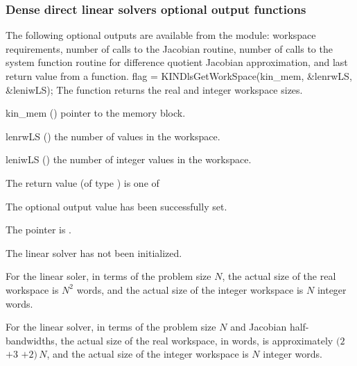 
\subsubsection{Dense direct linear solvers optional output functions}
\label{sss:optout_dense}
The following optional outputs are available from the {\kindls} module:
workspace requirements, number of calls to the Jacobian routine, number of 
calls to the system function routine for difference quotient Jacobian approximation,
and last return value from a {\kindls} function.
{
  flag = KINDlsGetWorkSpace(kin\_mem, \&lenrwLS, \&leniwLS);
}
{
  The function  returns the
  {\kindense} real and integer workspace sizes.
}
{
  \begin{args}
  \item[kin\_mem] ()
    pointer to the {\kinsol} memory block.
  \item[lenrwLS] ()
    the number of  values in the {\kindls} workspace.
  \item[leniwLS] ()
    the number of integer values in the {\kindls} workspace.
  \end{args}
}
{
  The return value  (of type ) is one of
  \begin{args}
  \item[\Id{KINDLS\_SUCCESS}] 
    The optional output value has been successfully set.
  \item[\Id{KINDLS\_MEM\_NULL}]
    The  pointer is .
  \item[\Id{KINDLS\_LMEM\_NULL}]
    The {\kindense} linear solver has not been initialized.
  \end{args}
}
{
  For the {\kindense} linear soler, in terms of the problem size $N$, 
  the actual size of the real workspace is $N^2$  words, 
  and the actual size of the integer workspace is $N$ integer words.

  For the {\kinband} linear solver, in terms of the problem size $N$ 
  and Jacobian half-bandwidths, the actual size of the real workspace, in
   words, is approximately
  $(2$ $+ 3$  $+ 2)\, N$,
  and the actual size of the integer workspace is $N$ integer words.
}
